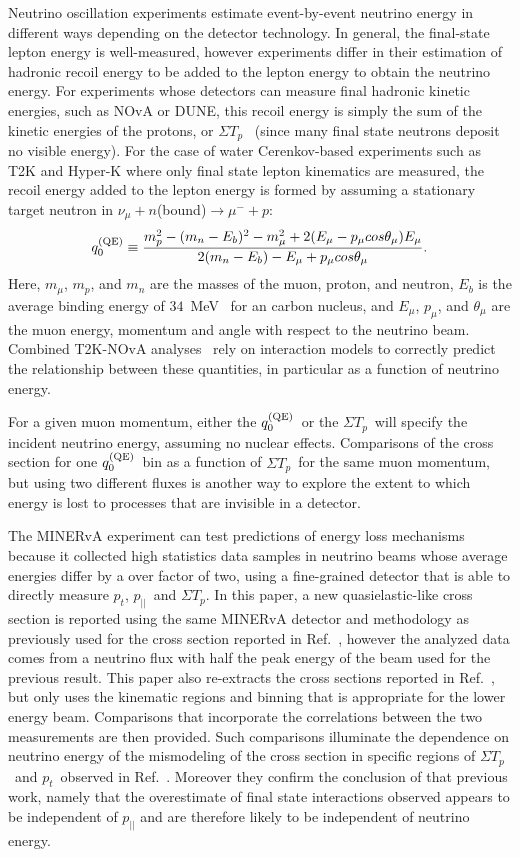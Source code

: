 \documentclass[aps,prl,twocolumn,showpacs,superscriptaddress, floatfix,10pt]{revtex4-2}
\newcommand{\pt}{\ensuremath{p_{t}}}
\newcommand{\pz}{\ensuremath{p_{||}}}
\newcommand{\sumtp}{\ensuremath{\Sigma T_{p}}}
\newcommand{\qzeroqe}{\ensuremath{q_{0}^{\rm\scriptstyle (QE)}}}
\begin{document}
Neutrino oscillation experiments estimate event-by-event neutrino energy in different ways depending on the detector technology.  In general, the final-state lepton energy is well-measured, however experiments differ in their estimation of hadronic recoil energy to be added to the lepton energy to 
obtain the neutrino energy. 
For experiments whose detectors can measure final hadronic kinetic energies, such as NOvA or DUNE, this recoil energy is simply the sum of the kinetic energies of the protons, or \sumtp~ (since many final state neutrons deposit no visible energy).  For the case of water Cerenkov-based experiments such as T2K and Hyper-K where only final state lepton kinematics are measured, the recoil energy added to the lepton energy is formed by assuming a stationary target neutron in $\nu_\mu + n$(bound)$ \rightarrow \mu^- + p$:
\begin{equation}
    \qzeroqe \equiv\frac{m_p^2-(m_n-E_b)^2-m_\mu^2+2(E_\mu-p_\mu cos\theta_\mu)E_\mu}{2(m_n-E_b)-E_\mu+p_\mu cos\theta_\mu}. \label{eqn:q0qe}
\end{equation}
Here, $m_\mu$, $m_p$, and $m_n$ are the masses of the muon, proton, and neutron, $E_b$ is the average binding energy of $34$~MeV~\cite{Bodek:2018lmc,Katori:2008zz,Moniz:1971mt} for an carbon nucleus, and $E_\mu$, $p_\mu$, and $\theta_\mu$ are the muon energy, momentum and angle with respect to the neutrino beam.
Combined T2K-NOvA analyses~\cite{T2K:2025wet}
rely on interaction models to correctly predict the relationship between these quantities, in particular as a function of neutrino energy.  

For a given muon momentum, either the \qzeroqe\ or the \sumtp\ will specify the incident neutrino energy, assuming no nuclear effects. Comparisons of the cross section for one \qzeroqe\ bin as a function of \sumtp\ for the same muon momentum, but using two different fluxes is another way to explore the extent to which energy is lost to processes that are invisible in a detector.  

The MINERvA experiment can test predictions of energy loss mechanisms because it collected high statistics data samples in neutrino beams whose average energies differ by a over factor of two, using a fine-grained detector that is able to directly measure \pt, \pz\ and \sumtp.   
In this paper, a new quasielastic-like cross section is reported using the same MINERvA detector and methodology as previously used for the cross section reported in Ref.~\cite{MINERvA:2022mnw}, however the analyzed data comes from a neutrino flux with half the peak energy of the beam used for the previous result.  This paper also re-extracts the cross sections reported in Ref.~\cite{MINERvA:2022mnw}, but only uses the kinematic regions and binning that is appropriate for the lower energy beam.
Comparisons that incorporate the correlations between the two measurements are then provided.  
Such comparisons illuminate the dependence on neutrino energy of the mismodeling of the cross section in specific regions of \sumtp\ and \pt\  observed in Ref.~\cite{MINERvA:2022mnw}.  Moreover they confirm the conclusion of that previous work, namely that the overestimate of final state interactions observed appears to be independent of $\pz$ and are therefore likely to be independent of neutrino energy.
\end{document}
